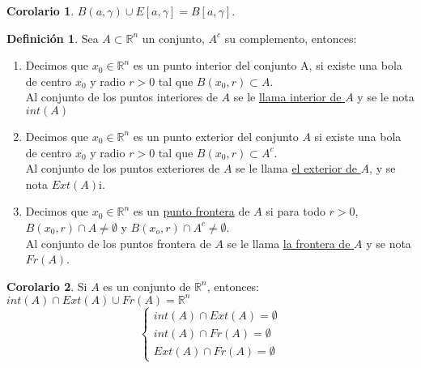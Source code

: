 \documentclass[10pt]{article}
\theoremstyle{definition}
\newtheorem{definition}{Definición}[section]
\newtheorem{corollary}{Corolario}[theorem]
\begin{document}
\begin{corollary}
	$B(a,\gamma) \cup E[a,\gamma]=B[a,\gamma]$.
\end{corollary}
\begin{definition}
    Sea $A\subset\mathbb{R}^n$ un conjunto, $A^c$ su complemento, entonces:
    \begin{enumerate}
        \item Decimos que $x_0\in\mathbb{R}^n$ es un punto interior del conjunto A, si existe una bola de centro $x_0$ y radio $r>0$ tal que $B(x_0,r)\subset A$.\\
            Al conjunto de los puntos interiores de $A$ se le \underline{llama interior de $A$} y se le nota $int(A)$
        \item Decimos que $x_0\in\mathbb{R}^n$ es un punto exterior del conjunto $A$ si existe una bola de centro $x_0$ y radio $r>0$ tal que $B(x_0,r)\subset A^c$.
            \\Al conjunto de los puntos exteriores de $A$ se le llama \underline{el exterior de $A$}, y se nota $Ext(A)$i.
        \item Decimos que $x_0 \in\mathbb{R}^n$ es un \underline{punto frontera} de $A$ si para todo $r>0$, $B(x_0,r)\cap A\ne \emptyset$ y $B(x_o,r)\cap A^c \ne \emptyset$.
            \\Al conjunto de los puntos frontera de $A$ se le llama \underline{la frontera de $A$} y se nota $Fr(A)$.
    \end{enumerate}
\end{definition}
\begin{corollary}
    Si $A$ es un conjunto de $\mathbb{R}^n$, entonces:
    \\$int(A)\cap Ext(A)\cup Fr(A)=\mathbb{R}^n$
    \\$$ \begin{cases}
        int(A)\cap Ext(A)=\emptyset
        \\ int(A)\cap Fr(A)=\emptyset
        \\ Ext(A)\cap Fr(A)=\emptyset
    \end{cases}$$
\end{corollary}
\end{document}

